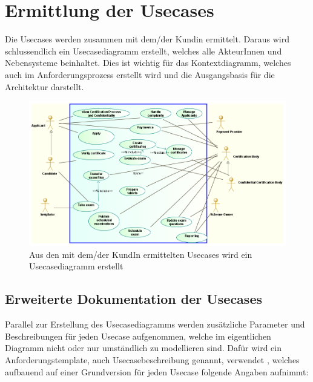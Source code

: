 \section{Ermittlung der Usecases}
Die Usecases werden zusammen mit dem/der Kundin ermittelt. Daraus wird schlussendlich ein Usecasediagramm erstellt, welches alle AkteurInnen und Nebensysteme beinhaltet. Dies ist wichtig für das Kontextdiagramm, welches auch im Anforderungsprozess erstellt wird und die Ausgangsbasis für die Architektur darstellt.

\begin{figure}[!htbp]
    \centering
    \includegraphics[scale=0.4]{uml/usecase.png}
    \caption{Aus den mit dem/der KundIn ermittelten Usecases wird ein Usecasediagramm erstellt}
\end{figure}

\subsection{Erweiterte Dokumentation der Usecases}
Parallel zur Erstellung des Usecasediagramms werden zusätzliche Parameter und Beschreibungen für jeden Usecase aufgenommen, welche im eigentlichen Diagramm nicht oder nur umständlich zu modellieren sind.
Dafür wird ein Anforderungstemplate, auch Usecasebeschreibung genannt, verwendet \cite[S. 214]{reqman}, welches aufbauend auf einer Grundversion \cite[Abbildung 8.14, S. 215]{reqman} für jeden Usecase folgende Angaben aufnimmt:

